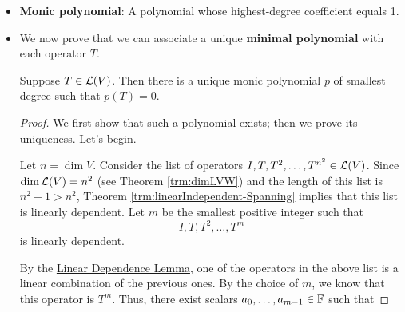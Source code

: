 \documentclass[../main.tex]{subfiles}
\begin{document}
\begin{itemize}
\begin{theorem}
\begin{proof}
            Let $\lambda_1,\dots,\lambda_m$ be the distinct eigenvalues of $T$. To prove that $q(T)=0$, it will suffice to show that $q(T)v=0$ for all $v\in V$. Let $v\in V$ be arbitrary. Then by Theorem \ref{trm:genEigenDecompa}, $v=u_1+\cdots+u_m$ where each $u_j\in G(\lambda_j,T)$. Additionally, Theorems \ref{trm:genEigenDecompc} and \ref{trm:NtothedimV} assert that each $(T-\lambda_jI)^{d_j}|_{G(\lambda_j,T)}=0$. Therefore, we have that
            \begin{equation*}
                q(T)v = \prod_{i=1}^m(T-\lambda_iI)^{d_i}(u_1+\cdots+u_m) = 0
            \end{equation*}
            since after distributing the operator to each term in the sum, we can restrict the domain of each exponential to $G(\lambda_j,T)$ and commute the $(T-\lambda_jI)^{d_j}|_{G(\lambda_j,T)}$ term to be applied first (by Theorem \ref{trm:polTMultiplicative}).
        \end{proof}
    \end{theorem}
    \item \textbf{Monic polynomial}: A polynomial whose highest-degree coefficient equals 1.
    \item We now prove that we can associate a unique \textbf{minimal polynomial} with each operator $T$.
    \begin{theorem}\label{trm:minPolynomial}
        Suppose $T\in\mathcal{L}(V)$. Then there is a unique monic polynomial $p$ of smallest degree such that $p(T)=0$.
        \begin{proof}
            We first show that such a polynomial exists; then we prove its uniqueness. Let's begin.\par
            Let $n=\dim V$. Consider the list of operators $I,T,T^2,\dots,T^{n^2}\in\mathcal{L}(V)$. Since $\dim\mathcal{L}(V)=n^2$ (see Theorem \ref{trm:dimLVW}) and the length of this list is $n^2+1>n^2$, Theorem \ref{trm:linearIndependent-Spanning} implies that this list is linearly dependent. Let $m$ be the smallest positive integer such that
            \begin{equation*}
                I,T,T^2,\dots,T^m
            \end{equation*}
            is linearly dependent.\par
            By the \hyperref[lem:linearDependenceLemma]{Linear Dependence Lemma}, one of the operators in the above list is a linear combination of the previous ones. By the choice of $m$, we know that this operator is $T^m$. Thus, there exist scalars $a_0,\dots,a_{m-1}\in\mathbb{F}$ such that

\end{proof}
\end{theorem}
\end{itemize}
\end{document}
